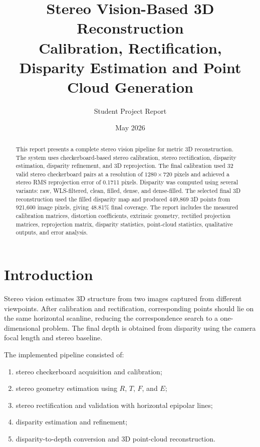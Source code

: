 \documentclass[11pt,a4paper]{article}
\title{\textbf{Stereo Vision-Based 3D Reconstruction\\Calibration, Rectification, Disparity Estimation and Point Cloud Generation}}
\author{Student Project Report}
\date{May 2026}
\begin{document}
\maketitle

\begin{abstract}
This report presents a complete stereo vision pipeline for metric 3D reconstruction. The system uses checkerboard-based stereo calibration, stereo rectification, disparity estimation, disparity refinement, and 3D reprojection. The final calibration used 32 valid stereo checkerboard pairs at a resolution of \(1280 \times 720\) pixels and achieved a stereo RMS reprojection error of 0.1711 pixels. Disparity was computed using several variants: raw, WLS-filtered, clean, filled, dense, and dense-filled. The selected final 3D reconstruction used the filled disparity map and produced 449,869 3D points from 921,600 image pixels, giving 48.81\% final coverage. The report includes the measured calibration matrices, distortion coefficients, extrinsic geometry, rectified projection matrices, reprojection matrix, disparity statistics, point-cloud statistics, qualitative outputs, and error analysis.
\end{abstract}

\tableofcontents
\newpage

\section{Introduction}

Stereo vision estimates 3D structure from two images captured from different viewpoints. After calibration and rectification, corresponding points should lie on the same horizontal scanline, reducing the correspondence search to a one-dimensional problem. The final depth is obtained from disparity using the camera focal length and stereo baseline.

The implemented pipeline consisted of:
\begin{enumerate}
    \item stereo checkerboard acquisition and calibration;
    \item stereo geometry estimation using \(R\), \(T\), \(F\), and \(E\);
    \item stereo rectification and validation with horizontal epipolar lines;
    \item disparity estimation and refinement;
    \item disparity-to-depth conversion and 3D point-cloud reconstruction.
\end{enumerate}
\end{document}
